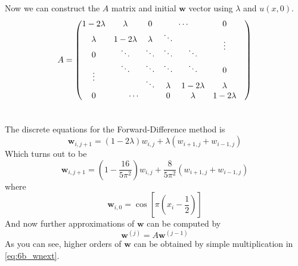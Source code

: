 \documentclass[12pt]{article}
\begin{document}
Now we can construct the $A$ matrix and initial $\mathbf{w}$ vector using $\lambda$ and $u(x,0)$.
\begin{equation}
  \label{eq:6b_A}
  \begin{aligned}
    A &=
    \begin{pmatrix}
      1-2\lambda & \lambda    & 0       & \multicolumn{2}{c}{\cdots} & 0 \\
      \lambda    & 1-2\lambda & \lambda & \ddots &  & \multirow{2}{*}{\vdots} \\
      0 & \ddots & \ddots & \ddots & \ddots & & \\
      \multirow{2}{*}{\vdots} & \ddots & \ddots & \ddots & \ddots & 0 \\
      & & \ddots & \lambda & 1-2\lambda & \lambda \\
      0 & \multicolumn{2}{c}{\cdots} & 0 & \lambda & 1-2\lambda \\
    \end{pmatrix} \\
    \\
  \end{aligned}
\end{equation}

The discrete equations for the Forward-Difference method is
\begin{equation}
  \label{eq:6b_discrete}
  \mathbf{w}_{i,j+1}=(1-2\lambda)w_{i,j}+\lambda(w_{i+1,j}+w_{i-1,j})
\end{equation}
Which turns out to be 
\begin{equation}
  \label{eq:6b_discrete_val}
  \mathbf{w}_{i,j+1}=\left(1-\frac{16}{5\pi^2}\right)w_{i,j}+\frac{8}{5\pi^2}(w_{i+1,j}+w_{i-1,j})
\end{equation}
where 
\begin{equation}
  \label{eq:6b_w_i_0}
  \mathbf{w}_{i,0} = \cos\left[\pi\left(x_i-\frac{1}{2}\right)\right]
\end{equation}
And now further approximations of $\mathbf{w}$ can be computed by
\begin{equation}
  \label{eq:6b_wnext}
  \mathbf{w}^{(j)} = A\mathbf{w}^{(j-1)}
\end{equation}
As you can see, higher orders of $\mathbf{w}$ can be obtained by
simple multiplication in \cref{eq:6b_wnext}.
\end{document}
